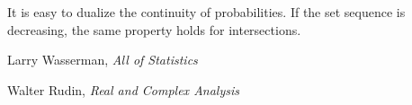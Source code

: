 It is easy to dualize the continuity of probabilities. If the set sequence is decreasing, the same property holds for intersections.

\begin{thebibliography}{10}
     Larry Wasserman,
    \emph{All of Statistics}

     Walter Rudin,
    \emph{Real and Complex Analysis}
\end{thebibliography}

